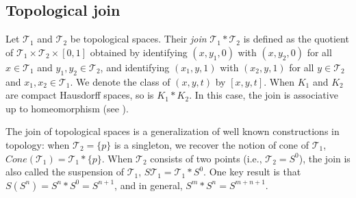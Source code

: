 \documentclass[12pt]{amsart}
\theoremstyle{plain}
\theoremstyle{definition}
\begin{document}

\subsection{Topological join} Let $\mathcal T_1$ and $\mathcal T_2$ be topological spaces. Their \emph{join} $\mathcal T_1\ast \mathcal T_2$ is defined as the quotient of $\mathcal T_1\times \mathcal T_2\times [0,1]$ obtained by identifying $(x,y_1,0)$ with $(x,y_2,0)$ for all $x\in \mathcal T_1$ and $y_1,y_2\in \mathcal T_2$, and identifying $(x_1,y,1)$ with $(x_2,y,1)$ for all $y\in \mathcal T_2$ and $x_1,x_2\in \mathcal T_1$. We denote the class of $(x,y,t)$ by $[x,y,t]$. When $K_1$ and $K_2$ are compact Hausdorff spaces, so is $K_1\ast K_2$. In this case, the join is associative up to homeomorphism (see \cite{hatcher}). 

The join of topological spaces is a generalization of well known constructions in topology: when $\mathcal T_2=\{p\}$ is a singleton, we recover the notion of cone of $\mathcal T_1$, $Cone(\mathcal T_1)=\mathcal T_1*\{p\}$. When $\mathcal T_2$ consists of two points (i.e., $\mathcal T_2=S^0$), the join is also called the suspension of $\mathcal T_1$, $S\mathcal T_1=\mathcal T_1*S^0$. One key result is that $S(S^n)=S^n*S^0=S^{n+1}$, and in general, $S^m*S^n=S^{m+n+1}$.
\end{document}
